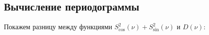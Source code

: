 \documentclass[12pt]{article}
\begin{document}
\vspace{10pt}
\begin{minipage}[h]{\linewidth}
\end{minipage}

\subsection{Вычисление периодограммы}

Покажем разницу между функциями $ S_{\cos}^2(\nu) + S_{\sin}^2(\nu) $ и $ D(\nu) $:

\vspace{10pt}
\begin{minipage}[h]{\linewidth}
\end{minipage}
\end{document}
